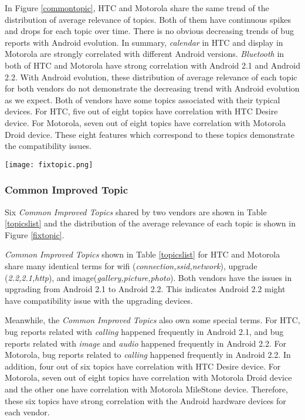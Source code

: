 \documentclass[10pt, conference, compsocconf]{IEEEtran}
\begin{document}
In Figure \ref{commontopic}, HTC and Motorola share the same trend of the distribution of average relevance of topics. Both of them have continuous spikes and drops for each topic over time. There is no obvious decreasing trends of bug reports with Android evolution.
In summary, \textit{calendar} in HTC and display in Motorola are strongly correlated with different Android versions. \textit{Bluetooth} in both of HTC and Motorola have strong correlation with Android 2.1 and Android 2.2. With Android evolution, these distribution of average relevance of each topic for both vendors do not demonstrate the decreasing trend with Android evolution as we expect. Both of vendors have some topics associated with their typical devices. For HTC, five out of eight topics have correlation with HTC Desire device. For Motorola, seven out of eight topics have correlation with Motorola Droid device. These eight features which correspond to these topics demonstrate the compatibility issues.

\begin{figure*}[htb]
\centering
\texttt{[image: fixtopic.png]}
\caption{Common Improved Topics in HTC and Motorola}
\label{fixtopic}
\end{figure*}

\subsubsection{Common Improved Topic}

Six \textit{Common Improved Topics} shared by two vendors are shown in Table \ref{topicslist} and the distribution of the average relevance of each topic is shown in Figure \ref{fixtopic}.

\textit{Common Improved Topics} shown in Table \ref{topicslist} for HTC and Motorola share many identical terms for wifi (\textit{connection,ssid,network}), upgrade (\textit{2.2,2.1,http}), and image(\textit{gallery,picture,photo}). Both vendors have the issues in upgrading from Android 2.1 to Android 2.2. This indicates Android 2.2 might have compatibility issue with the upgrading devices. 

Meanwhile, the \textit{Common Improved Topics} also own some special terms. For HTC, bug reports related with \textit{calling} happened frequently in Android 2.1, and bug reports related with \textit{image} and \textit{audio} happened frequently in Android 2.2. For Motorola, bug reports related to \textit{calling} happened frequently in Android 2.2. In addition, four out of six topics have correlation with HTC Desire device. For Motorola, seven out of eight topics have correlation with Motorola Droid device and the other one have correlation with Motorola MileStone device. Therefore, these six topics have strong correlation with the Android hardware devices for each vendor.
\end{document}
